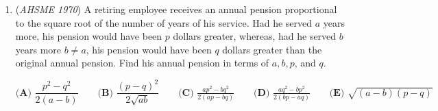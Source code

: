 \begin{enumerate}
	\item (\textit{AHSME 1970}) A retiring employee receives an annual pension proportional to the square root of the number of years of his service. 
Had he served $a$ years more, his pension would have been $p$ dollars greater, whereas, had he served $b$ years more $b\neq a$, 
his pension would have been $q$ dollars greater than the original annual pension. Find his annual pension in terms of $a,b,p$, and $q$.


 $\textbf{(A) }\dfrac{p^2-q^2}{2(a-b)}\qquad \textbf{(B) }\dfrac{(p-q)^2}{2\sqrt{ab}}\qquad \textbf{(C) }\frac{ap^2-bq^2}{2(ap-bq)}\qquad \textbf{(D) }\frac{aq^2-bp^2}{2(bp-aq)}\qquad \textbf{(E) }\sqrt{(a-b)(p-q)}$


\end{enumerate}